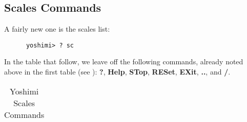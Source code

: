 \subsection{Scales Commands}
\label{subsec:command_line_scales_command_list}

   A fairly new one is the scales list:

   \begin{verbatim}
      yoshimi> ? sc
   \end{verbatim}

   In the table that follow, we leave off the following commands, already noted
   above in the first table
   (see ):
   \textbf{?}, \textbf{Help}, \textbf{STop}, \textbf{RESet},
   \textbf{EXit}, \textbf{..}, and \textbf{/}.

\begin{center}
\begin{longtable}{p{4cm} p{10cm}}
\caption[Yoshimi Scales Commands]{Yoshimi Scales Commands} \\


\end{longtable}
\end{center}
